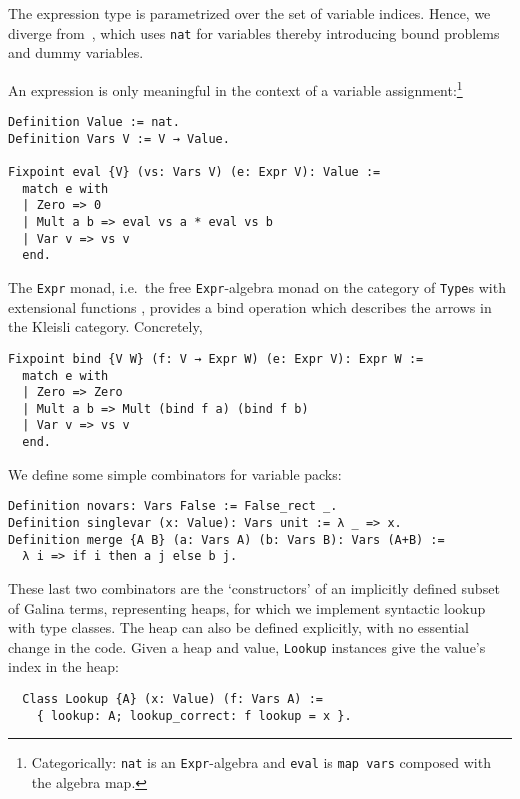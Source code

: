 \documentclass[a4paper,10pt,runningheads]{llncs}
\begin{document}
The expression type is parametrized over the set of variable indices. Hence, we diverge from~\cite{Hints}, 
which uses \lstinline|nat| for variables thereby introducing bound problems and dummy variables.

 An expression is only meaningful in the context of a variable
assignment:\footnote{Categorically: \lstinline|nat| is
an \lstinline|Expr|-algebra and \lstinline|eval| is \lstinline|map vars| composed with the algebra map.}
\begin{lstlisting}
Definition Value := nat.
Definition Vars V := V → Value.

Fixpoint eval {V} (vs: Vars V) (e: Expr V): Value :=
  match e with
  | Zero => 0
  | Mult a b => eval vs a * eval vs b
  | Var v => vs v
  end.
\end{lstlisting}

The \lstinline|Expr| monad, i.e.\ the free \lstinline|Expr|-algebra monad on the category of \lstinline|Type|s with extensional functions%
, provides a bind operation which describes the arrows in the Kleisli category. Concretely,
\begin{lstlisting}
Fixpoint bind {V W} (f: V → Expr W) (e: Expr V): Expr W :=
  match e with
  | Zero => Zero
  | Mult a b => Mult (bind f a) (bind f b)
  | Var v => vs v
  end.
\end{lstlisting}



\noindent We define some simple combinators for variable packs:
%
\begin{lstlisting}
Definition novars: Vars False := False_rect _.
Definition singlevar (x: Value): Vars unit := λ _ => x.
Definition merge {A B} (a: Vars A) (b: Vars B): Vars (A+B) :=
  λ i => if i then a j else b j.
\end{lstlisting}


\noindent These last two combinators are the `constructors' of an implicitly defined subset of
 Galina terms, representing heaps, for which we implement syntactic lookup with type classes.
The heap can also be defined explicitly, with no essential change in the code.
Given a heap and value, \lstinline|Lookup| instances give the value's index in the heap:
\begin{lstlisting}
  Class Lookup {A} (x: Value) (f: Vars A) :=
    { lookup: A; lookup_correct: f lookup = x }.
\end{lstlisting}
\end{document}
